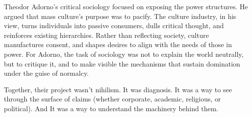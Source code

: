 Theodor Adorno’s critical sociology focused on exposing the power structures. He argued that mass culture's purpose was 
to pacify. The culture industry, in his view, turns individuals into passive consumers, dulls critical thought, and 
reinforces existing hierarchies. Rather than reflecting society, culture manufactures consent, and shapes desires to align 
with the needs of those in power. For Adorno, the task of sociology was not to explain the world neutrally, but to critique 
it, and to make visible the mechanisms that sustain domination under the guise of normalcy.

Together, their project wasn’t nihilism.  
It was diagnosis.  
It was a way to see through the surface of claims (whether corporate, academic, religious, or political). 
And It was a way to understand the machinery behind them.

\medskip

